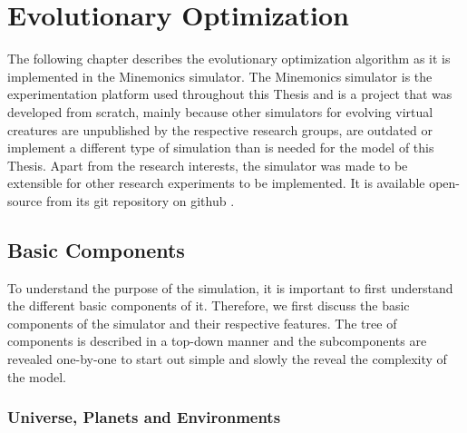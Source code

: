 \documentclass[main]{subfiles}
\begin{document}
\setcounter{chapter}{1}

\chapter{Evolutionary Optimization} %

\label{Chapter\thechapter} %


The following chapter describes the evolutionary optimization algorithm as it is implemented in the Minemonics simulator. %
%
The Minemonics simulator is the experimentation platform used throughout this Thesis and is a project that was developed from scratch, mainly because other simulators for evolving virtual creatures are unpublished by the respective research groups, are outdated or implement a different type of simulation than is needed for the model of this Thesis. %
%
Apart from the research interests, the simulator was made to be extensible for other research experiments to be implemented. %
%
It is available open-source from its git repository on github \cite{bib:Minemonics2016}.

\section{Basic Components}

To understand the purpose of the simulation, it is important to first understand the different basic components of it. %
%
Therefore, we first discuss the basic components of the simulator and their respective features. %
%
The tree of components is described in a top-down manner and the subcomponents are revealed one-by-one to start out simple and slowly the reveal the complexity of the model. 

\subsection{Universe, Planets and Environments}
\end{document}

